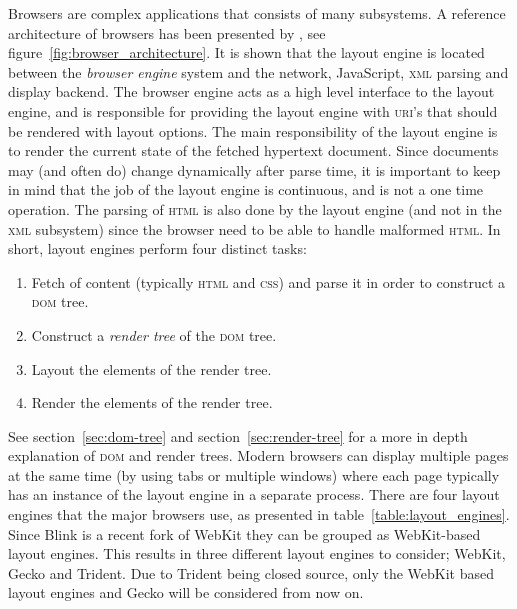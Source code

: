 \documentclass[a4paper,11pt]{kth-mag}
\begin{document}
      Browsers are complex applications that consists of many subsystems.
      A reference architecture of browsers has been presented by \cite{browser_architecture}, see figure~\ref{fig:browser_architecture}.
      It is shown that the layout engine is located between the \emph{browser engine} system and the network, JavaScript, \textsc{xml} parsing and display backend.
      The browser engine acts as a high level interface to the layout engine, and is responsible for providing the layout engine with \textsc{uri}'s that should be rendered with layout options.
      The main responsibility of the layout engine is to render the current state of the fetched hypertext document.
      Since documents may (and often do) change dynamically after parse time, it is important to keep in mind that the job of the layout engine is continuous, and is not a one time operation.
      The parsing of \textsc{html} is also done by the layout engine (and not in the \textsc{xml} subsystem) since the browser need to be able to handle malformed \textsc{html}.
      In short, layout engines perform four distinct tasks:
      \begin{enumerate}
        \item Fetch of content (typically \textsc{html} and \textsc{css}) and parse it in order to construct a \textsc{dom} tree.
        \item Construct a \emph{render tree} of the \textsc{dom} tree.
        \item Layout the elements of the render tree.
        \item Render the elements of the render tree.
      \end{enumerate}
      See section~\ref{sec:dom-tree} and section~\ref{sec:render-tree} for a more in depth explanation of \textsc{dom} and render trees.
      Modern browsers can display multiple pages at the same time (by using tabs or multiple windows) where each page typically has an instance of the layout engine in a separate process.
      There are four layout engines that the major browsers use, as presented in table~\ref{table:layout_engines}.
      Since Blink is a recent fork of WebKit they can be grouped as WebKit-based layout engines.
      This results in three different layout engines to consider; WebKit, Gecko and Trident.
      Due to Trident being closed source, only the WebKit based layout engines and Gecko will be considered from now on.
\end{document}
